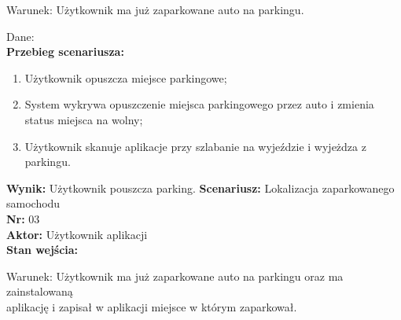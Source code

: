 \documentclass[12pt,a4paper]{article}
\begin{document}
Warunek: Użytkownik ma już zaparkowane auto na parkingu.

Dane:
\\{\bf Przebieg scenariusza:}
\begin{enumerate}
\item Użytkownik opuszcza miejsce parkingowe;
\item System wykrywa opuszczenie miejsca parkingowego przez auto i zmienia status miejsca na wolny;
\item Użytkownik skanuje aplikacje przy szlabanie na wyjeździe i wyjeżdza z parkingu.
\end{enumerate}
{\bf Wynik:} Użytkownik pouszcza parking.
\newline\newline\newline\newline\newline\newline\newline\newline\newline\newline\newline\newline\newline\newline\newline\newline
{\large \bf Scenariusz:} Lokalizacja zaparkowanego samochodu
\\{\bf Nr:} 03
\\{\bf Aktor:} Użytkownik aplikacji
\\{\bf Stan wejścia:}

Warunek: Użytkownik ma już zaparkowane auto na parkingu oraz ma zainstalowaną \\aplikację i zapisał w aplikacji miejsce w którym zaparkował.
\end{document}
